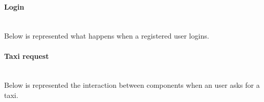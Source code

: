 \documentclass[a4paper,11pt]{report} %
\begin{document}
	\paragraph{Login} \mbox{}\\ %
	Below is represented what happens when a registered user logins.\smallskip \\
		\begin{minipage}{\linewidth}
		\end{minipage}
		
	\pagebreak	
	\paragraph{Taxi request} \mbox{}\\
	Below is represented the interaction between components when an user asks for a taxi.\\	
		\begin{minipage}{\linewidth}
		\end{minipage}	
	
\end{document}
